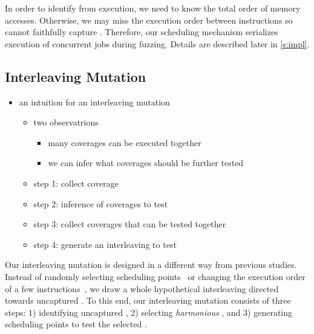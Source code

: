 In order to identify \segments from execution, we need to know the
total order of memory accesses. Otherwise, we may miss the execution
order between instructions so cannot faithfully capture \segments.
%
Therefore, our scheduling mechanism serializes execution of concurrent
jobs during fuzzing. Details are described later in \autoref{s:impl}.


\subsection{Interleaving Mutation}
\label{ss:scheduler}





\begin{itemize}
\item an intuition for an interleaving mutation
  \begin{itemize}
  \item two observatrions
    \begin{itemize}
      \item many coverages can be executed together
      \item we can infer what coverages should be further tested
      \end{itemize}
  \item step 1: collect coverage
  \item step 2: inference of coverages to test
  \item step 3: collect coverages that can be tested together
  \item step 4: generate an interleaving to test
  \end{itemize}
\end{itemize}




Our interleaving mutation is designed in a different way from previous
studies.
%
Instead of randomly selecting scheduling points~\cite{krace, ski} or
changing the execution order of a few instructions~\cite{razzer,
  snowboard}, we draw a whole hypothetical interleaving directed
towards uncaptured \segments.
%
To this end, our interleaving mutation consists of three steps:
%
1) identifying uncaptured \segments, 2) selecting \textit{harmonious}
\segments, and 3) generating scheduling points to test the selected
\segments.

